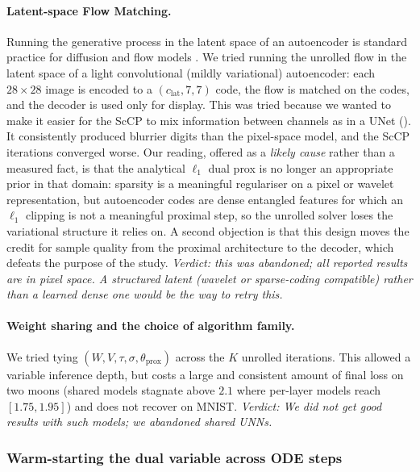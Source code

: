 \documentclass[a4paper,11pt]{article}
\theoremstyle{plain}{\theorembodyfont{\rmfamily}%
\newtheorem{proposition}[theorem]{Proposition}}
\theoremstyle{plain}{\theorembodyfont{\rmfamily}%
\newtheorem{notation}[theorem]{Notation}}
\theoremstyle{plain}{\theorembodyfont{\rmfamily}%
\newtheorem{assumption}[theorem]{Assumption}}
\theoremstyle{plain}{\theorembodyfont{\rmfamily}%
\newtheorem{problem}[theorem]{Problem}}
\theoremstyle{plain}{\theorembodyfont{\rmfamily}%
\newtheorem{example}[theorem]{Example}}
\theoremstyle{plain}{\theorembodyfont{\rmfamily}%
\newtheorem{remark}[theorem]{Remark}}
\theoremstyle{plain}{\theorembodyfont{\rmfamily}%
\newtheorem{definition}[theorem]{Definition}}
\theoremstyle{plain}{\theorembodyfont{\rmfamily}%
\newtheorem{question}[theorem]{Question}}
\numberwithin{equation}{section}
\begin{document}
\paragraph{Latent-space Flow Matching.} Running the generative process in the
latent space of an autoencoder is standard practice for diffusion and flow models
\cite{rombach2022high, esser2024scaling}. We tried running the unrolled flow in the
latent space of a light convolutional (mildly variational) autoencoder: each
$28\times28$ image is encoded to a $(c_{\text{lat}},7,7)$ code, the flow is matched
on the codes, and the decoder is used only for display. This was tried because we wanted to make it easier for the ScCP to mix information between channels as in a UNet (). It consistently produced blurrier digits than the
pixel-space model, and the ScCP iterations converged worse. Our reading,
offered as a \emph{likely cause} rather than a measured fact, is that the
analytical $\ell_1$ dual prox is no longer an appropriate prior in that domain:
sparsity is a meaningful regulariser on a pixel or wavelet representation, but
autoencoder codes are dense entangled features for which an $\ell_1$ clipping is
not a meaningful proximal step, so the unrolled solver loses the variational
structure it relies on. A second objection is that this design moves
the credit for sample quality from the proximal architecture to the decoder, which
defeats the purpose of the study. \emph{Verdict: this was abandoned; all reported results are in pixel space. A structured latent (wavelet or sparse-coding
compatible) rather than a learned dense one would be the way to retry this.}

\paragraph{Weight sharing and the choice of algorithm family.} We tried tying
$(W,V,\tau,\sigma,\theta_{\text{prox}})$ across the $K$ unrolled iterations. This allowed a variable inference depth, but costs a large and consistent amount of
final loss on two moons (shared models stagnate above $2.1$ where per-layer models
reach $[1.75,1.95]$) and does not recover on MNIST. \emph{Verdict: We did not get good results with such models; we abandoned shared UNNs.}

\subsubsection{Warm-starting the dual variable across ODE steps}
\label{subsec:warmstart}
\end{document}
